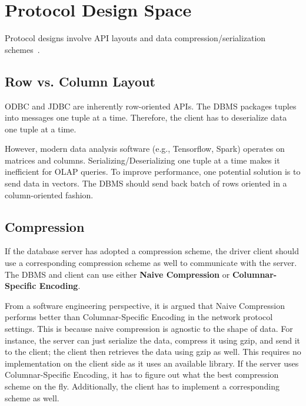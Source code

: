 \documentclass[11pt]{article}
\begin{document}
\section{Protocol Design Space}
Protocol designs involve API layouts and data compression/serialization schemes~\cite{p1022-muehleisen}.

\subsection*{Row vs. Column Layout}
ODBC and JDBC are inherently row-oriented APIs. The DBMS packages tuples into messages one tuple at a time. Therefore, the client has to deserialize data one tuple at a time. 

However, modern data analysis software (e.g., Tensorflow, Spark) operates on matrices and columns. Serializing/Deserializing one tuple at a time makes it inefficient for OLAP queries. To improve performance, one potential solution is to send data in vectors. The DBMS should send back batch of rows oriented in a column-oriented fashion.

\subsection*{Compression}
If the database server has adopted a compression scheme, the driver client should use a corresponding compression scheme as well to communicate with the server. The DBMS and client can use either \textbf{Naive Compression} or \textbf{Columnar-Specific Encoding}.

From a software engineering perspective, it is argued that Naive Compression performs better than Columnar-Specific Encoding in the network protocol settings. This is because naive compression is agnostic to the shape of data. For instance, the server can just serialize the data, compress it using gzip, and send it to the client; the client then retrieves the data using gzip as well. This requires no implementation on the client side as it uses an available library. If the server uses Columnar-Specific Encoding, it has to figure out what the best compression scheme on the fly. Additionally, the client has to implement a corresponding scheme as well. 
\end{document}

